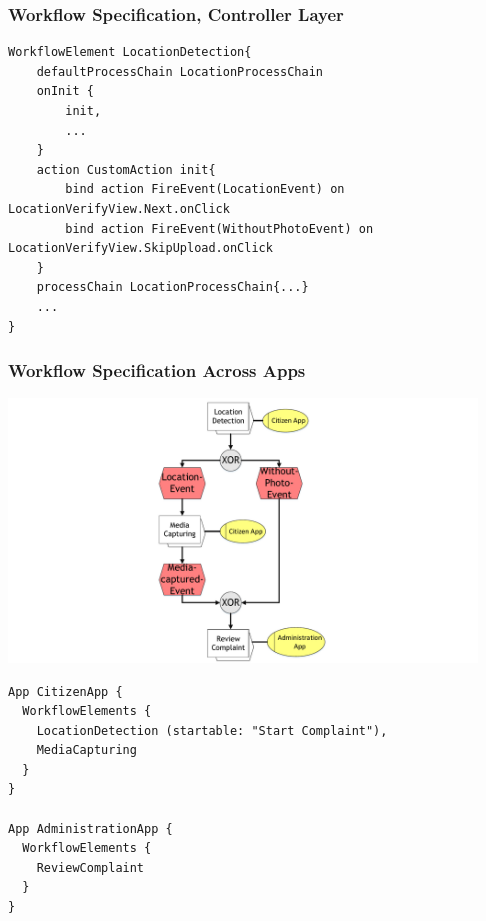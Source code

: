 \begin{frame}[fragile]
 \frametitle{Workflow Specification, Controller Layer}
 
\begin{lstlisting}[basicstyle=\footnotesize\ttfamily]
WorkflowElement LocationDetection{
    defaultProcessChain LocationProcessChain
    onInit {
        init,
        ...
    }	
    action CustomAction init{
        bind action FireEvent(LocationEvent) on LocationVerifyView.Next.onClick
        bind action FireEvent(WithoutPhotoEvent) on LocationVerifyView.SkipUpload.onClick
    }
    processChain LocationProcessChain{...}
    ...
}
\end{lstlisting}
\end{frame}


\begin{frame}
	\plainnumber
	\frametitle{Workflow Specification Across Apps}
	
	\begin{minipage}{0.45\textwidth}
	    		        \includegraphics[height = 7cm, trim = 10cm 0cm 10cm 0cm, clip = true]{images/wfAcrossApps}	  
	\end{minipage}\hfill
	\begin{minipage}{0.5\textwidth}
\begin{lstlisting}
App CitizenApp {
  WorkflowElements {
    LocationDetection (startable: "Start Complaint"),
    MediaCapturing
  }
}

App AdministrationApp {
  WorkflowElements {
    ReviewComplaint
  }
}
\end{lstlisting}
\end{minipage}

\end{frame}

